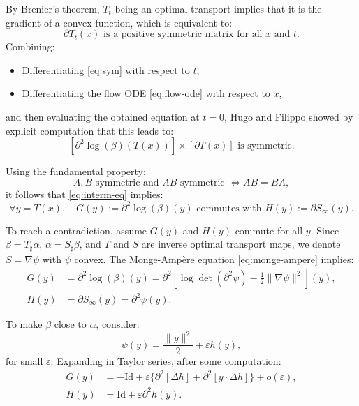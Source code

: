 \documentclass{article}
\begin{document}
By Brenier's theorem, $T_t$ being an optimal transport implies that it is the gradient of a convex function, which is equivalent to:
\begin{equation}\label{eq:sym}
    \partial T_t(x) \text{ is a positive symmetric matrix for all } x \text{ and } t. 
\end{equation}
Combining:
\begin{itemize}
\item Differentiating \eqref{eq:sym} with respect to $t$,
\item Differentiating the flow ODE \eqref{eq:flow-ode} with respect to $x$,
\end{itemize}
and then evaluating the obtained equation at $t = 0$, Hugo and Filippo showed by explicit computation that this leads to:
\begin{equation}\label{eq:interm-eq}
    [\partial^2 \log(\beta)(T(x))] \times [\partial T(x)] \text{ is symmetric.} 
\end{equation}

Using the fundamental property:
\[
    A, B \text{ symmetric and } AB \text{ symmetric } \iff AB = BA,
\]
it follows that \eqref{eq:interm-eq} implies:
\begin{equation}
    \forall y = T(x), \quad G(y) := \partial^2 \log(\beta)(y) \text{ commutes with } H(y) := \partial S_\infty(y).
\end{equation}

To reach a contradiction, assume $G(y)$ and $H(y)$ commute for all $y$. Since $\beta = T_\sharp \alpha$, $\alpha = S_\sharp \beta$, and $T$ and $S$ are inverse optimal transport maps, we denote $S = \nabla \psi$ with $\psi$ convex. The Monge-Ampère equation \eqref{eq:monge-ampere} implies:
\begin{align*}
    G(y) &= \partial^2 \log(\beta)(y) = \partial^2 \left[\log\det(\partial^2 \psi) - \frac{1}{2} \|\nabla \psi\|^2\right](y), \\
    H(y) &= \partial S_\infty(y) = \partial^2 \psi(y).
\end{align*}

To make $\beta$ close to $\alpha$, consider:
\[
    \psi(y) = \frac{\|y\|^2}{2} + \varepsilon h(y),
\]
for small $\varepsilon$. Expanding in Taylor series, after some computation:
\begin{align*}
    G(y) &= -\text{Id} + \varepsilon \{\partial^2[\Delta h] + \partial^2[y \cdot \Delta h]\} + o(\varepsilon), \\
    H(y) &= \text{Id} + \varepsilon \partial^2 h(y).
\end{align*}
\end{document}
